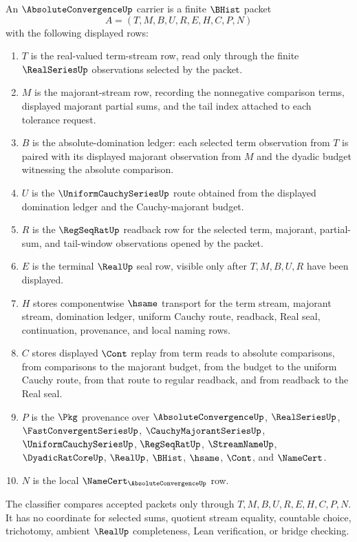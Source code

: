 \begin{definition}\label{def:absolute-convergence-carrier}
An $\AbsoluteConvergenceUp$ carrier is a finite $\BHist$ packet
$$
A=(T,M,B,U,R,E,H,C,P,N)
$$
with the following displayed rows:
\begin{enumerate}
\item $T$ is the real-valued term-stream row, read only through the finite $\RealSeriesUp$ observations selected by the packet.
\item $M$ is the majorant-stream row, recording the nonnegative comparison terms, displayed majorant partial sums, and the tail index attached to each tolerance request.
\item $B$ is the absolute-domination ledger: each selected term observation from $T$ is paired with its displayed majorant observation from $M$ and the dyadic budget witnessing the absolute comparison.
\item $U$ is the $\UniformCauchySeriesUp$ route obtained from the displayed domination ledger and the Cauchy-majorant budget.
\item $R$ is the $\RegSeqRatUp$ readback row for the selected term, majorant, partial-sum, and tail-window observations opened by the packet.
\item $E$ is the terminal $\RealUp$ seal row, visible only after $T,M,B,U,R$ have been displayed.
\item $H$ stores componentwise $\hsame$ transport for the term stream, majorant stream, domination ledger, uniform Cauchy route, readback, Real seal, continuation, provenance, and local naming rows.
\item $C$ stores displayed $\Cont$ replay from term reads to absolute comparisons, from comparisons to the majorant budget, from the budget to the uniform Cauchy route, from that route to regular readback, and from readback to the Real seal.
\item $P$ is the $\Pkg$ provenance over $\AbsoluteConvergenceUp$, $\RealSeriesUp$, $\FastConvergentSeriesUp$, $\CauchyMajorantSeriesUp$, $\UniformCauchySeriesUp$, $\RegSeqRatUp$, $\StreamNameUp$, $\DyadicRatCoreUp$, $\RealUp$, $\BHist$, $\hsame$, $\Cont$, and $\NameCert$.
\item $N$ is the local $\NameCert_{\AbsoluteConvergenceUp}$ row.
\end{enumerate}
The classifier compares accepted packets only through $T,M,B,U,R,E,H,C,P,N$. It has no coordinate for selected sums, quotient stream equality, countable choice, trichotomy, ambient $\RealUp$ completeness, Lean verification, or bridge checking.
\end{definition}

